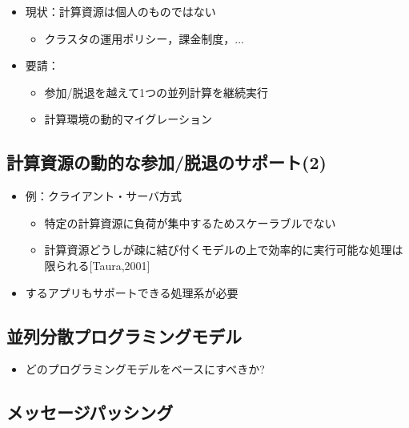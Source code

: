 \documentclass[25pt,landscape,papersize]{jsarticle}
\begin{document}
\begin{itemize}
\item 現状：計算資源は個人のものではない
  \begin{itemize}
  \item クラスタの運用ポリシー，課金制度，...
  \end{itemize}
\item 要請：
  \begin{itemize}
  \item 参加/脱退を越えて1つの並列計算を継続実行
  \item 計算環境の動的マイグレーション
  \end{itemize}
\end{itemize}


\subsection{計算資源の動的な参加/脱退のサポート(2)}

\begin{itemize}
\item 例：クライアント・サーバ方式
  \begin{itemize}
  \item 特定の計算資源に負荷が集中するためスケーラブルでない
  \item 計算資源どうしが疎に結び付くモデルの上で効率的に実行可能な処理は限られる[Taura,2001]
  \end{itemize}
\item {}するアプリもサポートできる処理系が必要
\end{itemize}


\subsection{並列分散プログラミングモデル}

\begin{itemize}
\item どのプログラミングモデルをベースにすべきか?
\end{itemize}


\subsection{メッセージパッシング}
\end{document}
